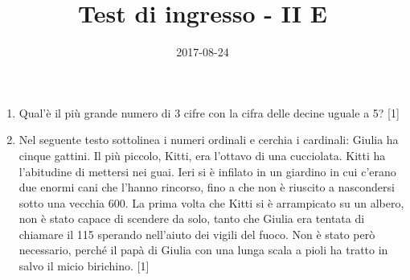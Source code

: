 \documentclass[11pt,fleqn]{article} %
\title{Test di ingresso - II E}
\date{2017-08-24}
\begin{document}
\maketitle
\begin{enumerate}

\item Qual'è il più grande numero di 3 cifre con la cifra delle decine uguale a 5? [1] 
\item Nel seguente testo sottolinea i numeri ordinali e cerchia i cardinali: Giulia ha cinque gattini. Il più piccolo, Kitti, era l'ottavo di una cucciolata. Kitti ha l'abitudine di mettersi nei guai. Ieri si è infilato in un giardino in cui c'erano due enormi cani che l'hanno rincorso, fino a che non è riuscito a nascondersi sotto una vecchia 600. La prima volta che Kitti si è arrampicato su un albero, non è stato capace di scendere da solo, tanto che Giulia era tentata di chiamare il 115 sperando nell'aiuto dei vigili del fuoco. Non è stato però necessario, perché il papà di Giulia con una lunga scala a pioli ha tratto in salvo il micio birichino.  [1] 
\end{enumerate}
\end{document}
